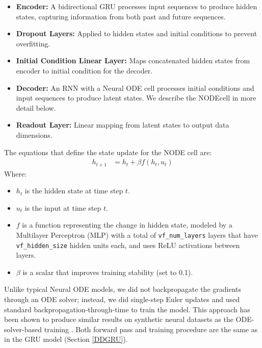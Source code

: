 \documentclass{article}
\begin{document}
\begin{itemize}
    \item \textbf{Encoder:} A bidirectional GRU processes input sequences to produce hidden states, capturing information from both past and future sequences.
    \item \textbf{Dropout Layers:} Applied to hidden states and initial conditions to prevent overfitting.
    \item \textbf{Initial Condition Linear Layer:} Maps concatenated hidden states from encoder to initial condition for the decoder.
    \item \textbf{Decoder:} An RNN with a Neural ODE cell processes initial conditions and input sequences to produce latent states. We describe the NODEcell in more detail below.
    \item \textbf{Readout Layer:} Linear mapping from latent states to output data dimensions.
\end{itemize}

The equations that define the state update for the NODE cell are:
\begin{align}
h_{t+1} &= h_t + \beta f(h_t, u_t)
\end{align}
Where:
\begin{itemize}
    \item \( h_t \) is the hidden state at time step \( t \).
    \item \( u_t \) is the input at time step \( t \).
    \item \( f \) is a function representing the change in hidden state, modeled by a Multilayer Perceptron (MLP) with a total of \texttt{vf\_num\_layers} layers that have \texttt{vf\_hidden\_size} hidden units each, and uses ReLU activations between layers.
    \item \(\beta\) is a scalar that improves training stability (set to 0.1).
\end{itemize}
Unlike typical Neural ODE models, we did not backpropagate the gradients through an ODE solver; instead, we did single-step Euler updates and used standard backpropagation-through-time to train the model. This approach has been shown to produce similar results on synthetic neural datasets as the ODE-solver-based training \cite{versteeg2023expressive, sedler_expressive_2022}.
Both forward pass and training procedure are the same as in the GRU model (Section \ref{DDGRU}).
\end{document}
